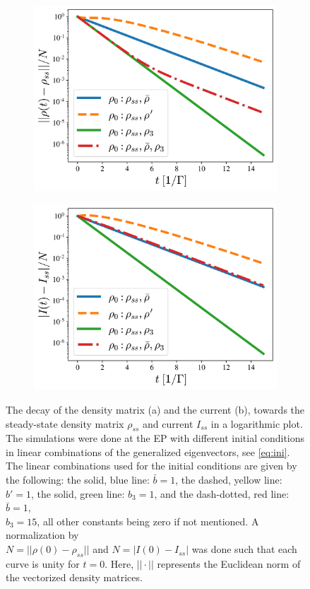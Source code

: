 \documentclass[../main.tex]{subfiles}
\begin{document}
\begin{figure}[H]
\centering
\begin{subfigure}[t]{.5\textwidth}
  \centering
  \includegraphics[width=\linewidth]{figures/rho_diff_rho0_fin.png}
  \caption{}
  \label{fig:rhodiffrho0}
\end{subfigure}%
\begin{subfigure}[t]{.5\textwidth}
  \centering
  \includegraphics[width=\linewidth]{figures/I_diff_rho0_nonvis.png}
  \caption{}
  \label{fig:Idiffrho0}
\end{subfigure}
\caption{The decay of the density matrix (a) and the current (b), towards the steady-state density matrix $\rho_{ss}$ and current $I_{ss}$ in a logarithmic plot. The simulations were done at the EP with different initial conditions in linear combinations of the generalized eigenvectors, see \cref{eq:ini}. The linear combinations used for the initial conditions are given by the following: the solid, blue line: $\bar b = 1$, the dashed, yellow line: $b'=1$, the solid, green line: $b_3=1$, and the dash-dotted, red line: $\bar b=1,$ \\{$b_3=15$}, all other constants being zero if not mentioned. A normalization by \\{$N=||\rho(0) - \rho_{ss}||$} and $N=|I(0) - I_{ss}|$ was done such that each curve is unity for $t=0$. Here, $||\cdot||$ represents the Euclidean norm of the vectorized density matrices.}

\end{figure}
\end{document}

